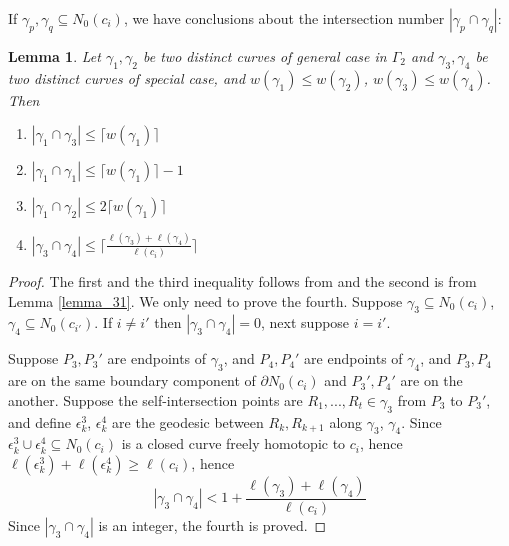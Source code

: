 \documentclass[11pt, a4paper]{article}
\newtheorem{thm}{Theorem}[section]
\newtheorem{lemma}[thm]{Lemma}
\theoremstyle{definition}
\theoremstyle{remark}
\newcommand{\abs}[1]{\left| #1 \right|}
\begin{document}

If $\gamma_p,\gamma_q\subseteq N_0(c_i)$, we have conclusions about the intersection number $\abs{\gamma_p\cap\gamma_q}$:

\begin{lemma}
  Let $\gamma_1,\gamma_2$ be two distinct curves of general case in $\Gamma_2$ and $\gamma_3,\gamma_4$ be two distinct curves of special case, and $w(\gamma_1)\leqslant w(\gamma_2)$, $w(\gamma_3)\leqslant w(\gamma_4)$. Then
\begin{enumerate}
\item $\abs{\gamma_1\cap\gamma_3}\leqslant\lceil{w(\gamma_1)}\rceil$
\item $\abs{\gamma_1\cap\gamma_1}\leqslant\lceil{w(\gamma_1)}\rceil-1$
\item $\abs{\gamma_1\cap\gamma_2}\leqslant2\lceil{w(\gamma_1)}\rceil$
\item $\abs{\gamma_3\cap\gamma_4}\leqslant\lceil\frac{\ell(\gamma_3)+\ell(\gamma_4)}{\ell(c_i)}\rceil$
\end{enumerate}
\end{lemma}


\begin{proof}
 The first and the third inequality follows from \cite[Lemma 3.2]{EP2802} and the second is from Lemma \ref{lemma_31}. We only need to prove the fourth. Suppose $\gamma_3\subseteq N_0(c_i)$, $\gamma_4\subseteq N_0(c_{i'})$. If $i\neq i'$ then $\abs{\gamma_3\cap\gamma_4}=0$, next suppose $i=i'$.

Suppose $P_3,P_3'$ are endpoints of $\gamma_3$, and $P_4,P_4'$ are endpoints of $\gamma_4$, and $P_3,P_4$ are on the same boundary component of $\partial N_0(c_i)$ and $P_3',P_4'$ are on the another. Suppose the self-intersection points are $R_1,...,R_t\in\gamma_3$ from $P_3$ to $P_3'$, and define $\epsilon_k^3$, $\epsilon_k^4$ are the geodesic between $R_k,R_{k+1}$ along $\gamma_3$, $\gamma_4$. Since $\epsilon_k^3\cup\epsilon_k^4\subseteq N_0(c_i)$ is a closed curve freely homotopic to $c_i$, hence $\ell(\epsilon_k^3)+\ell(\epsilon_k^4)\geqslant\ell(c_i)$, hence
$$\abs{\gamma_3\cap\gamma_4}<1+\frac{\ell(\gamma_3)+\ell(\gamma_4)}{\ell(c_i)}$$
Since $\abs{\gamma_3\cap\gamma_4}$ is an integer, the fourth is proved.

\end{proof}
\end{document}
